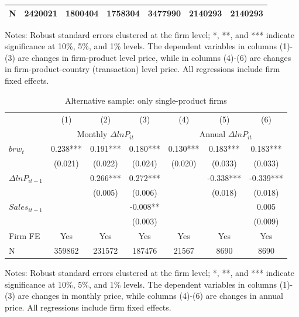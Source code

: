 \begin{table}[htbp]
{\begin{threeparttable}
\begin{tabular}{lcccccc}
        N     & 2420021 & 1800404 & 1758304 & 3477990 & 2140293 & 2140293 \\
        \bottomrule
    \end{tabular}
        \begin{tablenotes}
            \footnotesize
            \item Notes: Robust standard errors clustered at the firm level;  *, **, and *** indicate significance at 10\%, 5\%, and 1\% levels. The dependent variables in columns (1)-(3) are changes in firm-product level price, while in columns (4)-(6) are changes in firm-product-country (transaction) level price. All regressions include firm fixed effects.
	\end{tablenotes}
    \end{threeparttable}
    }
    \label{tab.altagg}
\end{table}

\begin{table}[htbp]
    \centering
    \caption{Alternative sample: only single-product firms}
    \begin{threeparttable}
    \begin{tabular}{lcccccc}
        \toprule
        & (1)   & (2)   & (3)   & (4)   & (5)   & (6) \\
        & \multicolumn{3}{c}{Monthly $\Delta ln P_{it}$} & \multicolumn{3}{c}{Annual $\Delta ln P_{it}$}  \\
        \midrule
        $brw_t$   & 0.238*** & 0.191*** & 0.180*** & 0.130*** & 0.183*** & 0.183*** \\
              & (0.021) & (0.022) & (0.024) & (0.020) & (0.033) & (0.033) \\
        $\Delta ln P_{it-1}$ &       & 0.266*** & 0.272*** &       & -0.338*** & -0.339***\\
              &       & (0.005) & (0.006) &       &   (0.018) & (0.018) \\
        $Sales_{it-1}$ &       &       & -0.008** &       &       & 0.005  \\
              &       &       & (0.003) &       &       &  (0.009) \\
        \midrule
        Firm FE & Yes   & Yes   & Yes   & Yes   & Yes   & Yes \\
        N     & 359862 & 231572 & 187476 & 21567 & 8690  & 8690 \\
        \bottomrule
    \end{tabular}
        \begin{tablenotes}
            \footnotesize
            \item Notes: Robust standard errors clustered at the firm level;  *, **, and *** indicate significance at 10\%, 5\%, and 1\% levels. The dependent variables in columns (1)-(3) are changes in monthly price, while columns (4)-(6) are changes in annual price. All regressions include firm fixed effects.
	\end{tablenotes}
    \end{threeparttable}
    \label{tab.single}
\end{table}

